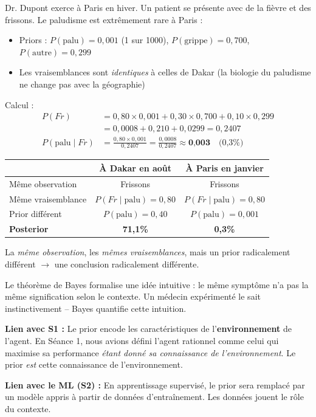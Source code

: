 \documentclass[11pt,a4paper]{article}
\begin{document}
\begin{exemplebox}
Dr. Dupont exerce à Paris en hiver. Un patient se présente avec de la fièvre et des frissons. Le paludisme est extrêmement rare à Paris :
\begin{itemize}[nosep]
    \item Priors : $P(\text{palu}) = 0{,}001$ (1 sur 1000), \; $P(\text{grippe}) = 0{,}700$, \; $P(\text{autre}) = 0{,}299$
    \item Les vraisemblances sont \textit{identiques} à celles de Dakar (la biologie du paludisme ne change pas avec la géographie)
\end{itemize}

Calcul :
\begin{align*}
P(Fr) &= 0{,}80 \times 0{,}001 + 0{,}30 \times 0{,}700 + 0{,}10 \times 0{,}299 \\
&= 0{,}0008 + 0{,}210 + 0{,}0299 = 0{,}2407 \\[5pt]
P(\text{palu} \mid Fr) &= \frac{0{,}80 \times 0{,}001}{0{,}2407} = \frac{0{,}0008}{0{,}2407} \approx \textbf{0,003} \quad \text{(0,3\%)}
\end{align*}

\begin{center}
\begin{tabular}{lcc}
\toprule
& \textbf{À Dakar en août} & \textbf{À Paris en janvier} \\
\midrule
Même observation & Frissons & Frissons \\
Même vraisemblance & $P(Fr \mid \text{palu}) = 0{,}80$ & $P(Fr \mid \text{palu}) = 0{,}80$ \\
Prior différent & $P(\text{palu}) = 0{,}40$ & $P(\text{palu}) = 0{,}001$ \\
\midrule
\textbf{Posterior} & \textbf{71,1\%} & \textbf{0,3\%} \\
\bottomrule
\end{tabular}
\end{center}

La \textit{même observation}, les \textit{mêmes vraisemblances}, mais un prior radicalement différent $\to$ une conclusion radicalement différente.
\end{exemplebox}

\begin{retenirbox}
Le théorème de Bayes formalise une idée intuitive : le même symptôme n'a pas la même signification selon le contexte. Un médecin expérimenté le sait instinctivement -- Bayes quantifie cette intuition.

\textbf{Lien avec S1 :} Le prior encode les caractéristiques de l'\textbf{environnement} de l'agent. En Séance 1, nous avions défini l'agent rationnel comme celui qui maximise sa performance \textit{étant donné sa connaissance de l'environnement}. Le prior \textit{est} cette connaissance de l'environnement.

\textbf{Lien avec le ML (S2) :} En apprentissage supervisé, le prior sera remplacé par un modèle appris à partir de données d'entraînement. Les données jouent le rôle du contexte.
\end{retenirbox}
\end{document}
